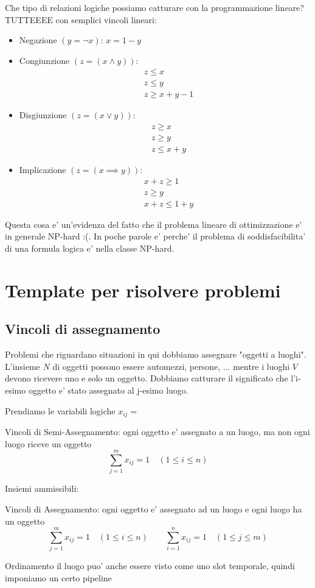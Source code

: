 Che tipo di relazioni logiche possiamo catturare con la programmazione lineare? TUTTEEEE con semplici vincoli lineari:
\begin{itemize}
  \item Negazione $ (y = \neg x) $: $ x = 1-y $
  \item Congiunzione $ (z = (x \land y)) $: 
    \[
    \begin{aligned}
      &z \leq x\\
      &z \leq y\\
      &z \geq x + y -1
    \end{aligned}
    \]
  \item Disgiunzione $ (z = (x \lor y)) $: 
    \[
    \begin{aligned}
      &z \geq x\\
      &z \geq y\\
      &z \leq x + y
    \end{aligned}
    \]
  \item Implicazione $ (z = (x \implies y)) $:
    \[
    \begin{aligned}
      &x+z \geq 1\\
      &z \geq y\\
      &x+z \leq 1 + y
    \end{aligned}
    \]
\end{itemize}

Questa cosa e' un'evidenza del fatto che il problema lineare di ottimizzazione e' in generale NP-hard :(. In poche parole e' perche' il problema di soddisfacibilita' di una formula logica e' nella classe NP-hard.

\section{Template per risolvere problemi}

\subsection{Vincoli di assegnamento}

Problemi che riguardano situazioni in qui dobbiamo assegnare "oggetti a luoghi". L'insieme $ N $ di oggetti possono essere automezzi, persone, ... mentre i luoghi $ V $ devono ricevere uno e solo un oggetto. Dobbiamo catturare il significato che l'i-esimo oggetto e' stato assegnato al j-esimo luogo.

Prendiamo le variabili logiche $ x_{ij} =  $

Vincoli di Semi-Assegnamento: ogni oggetto e' assegnato a un luogo, ma non ogni luogo riceve un oggetto
\[
  \sum_{j=1}^{m} x_{ij} = 1 \quad (1 \leq i \leq n)
\]

Insiemi ammissibili:

Vincoli di Assegnamento: ogni oggetto e' assegnato ad un luogo e ogni luogo ha un oggetto
\[
  \sum_{j=1}^{m} x_{ij} = 1 \quad (1 \leq i \leq n) \qquad \sum_{i=1}^{n} x_{ij} = 1 \quad (1 \leq j \leq m)
\]

Ordinamento
il luogo puo' anche essere visto come uno slot temporale, quindi imponiamo un certo pipeline

